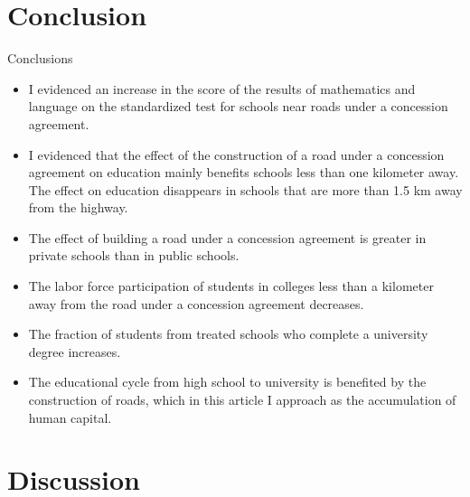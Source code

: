 \documentclass[9pt]{beamer}
\begin{document}
\section{Conclusion}


\begin{frame}{Conclusions}
\begin{itemize}
     \item I evidenced an increase in the score of the results of mathematics and language on the standardized test for schools near roads under a concession agreement.
    
    \item I evidenced that the effect of the construction of a road under a concession agreement on education mainly benefits schools less than one kilometer away. The effect on education disappears in schools that are more than 1.5 km away from the highway.

    \item The effect of building a road under a concession agreement is greater in private schools than in public schools.

    \item The labor force participation of students in colleges less than a kilometer away from the road under a concession agreement decreases.
    
    \item The fraction of students from treated schools who complete a university degree increases. 
    
    \item The educational cycle from high school to university is benefited by the construction of roads, which in this article I approach as the accumulation of human capital.
    
\end{itemize}

\end{frame}

\section{Discussion}
 
\end{document}
